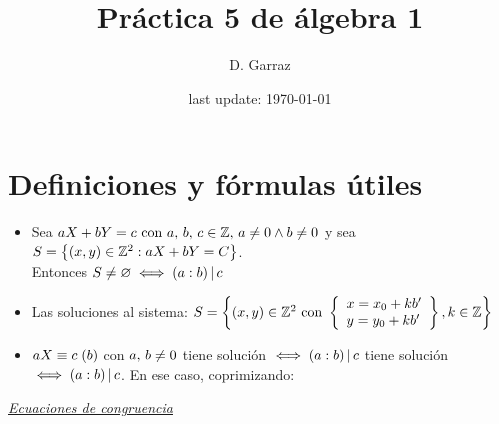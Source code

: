 





\pagestyle{empty} %

\title{Práctica 5 de álgebra 1} %
\author{D. Garraz} %
\date{last update: \today} %

\maketitle  %

\section{Definiciones y fórmulas útiles}

\def\mcd{(a:b)}

\begin{itemize}
	\item Sea $aX + bY = c \text{ con } a,\, b,\, c \en \enteros,\, a \distinto 0 \y b \distinto 0$ y sea
	      $S = \set{ (x,y) \en \enteros^2 : aX + bY = C }$.\\
	      Entonces $S \distinto \vacio \sisolosi (a:b) \divideA c$

	\item Las soluciones al sistema: $S = \set{(x,y) \en \enteros^2 \text{ con }
			      \llaves{l}{
				      x = x_0 + kb'\\
				      y = y_0 + kb'
			      }
			      , k \en \enteros}
	      $

	\item $\congruencia{aX}{c}{b}$ con $ a,\, b \distinto 0$ tiene solución $\sisolosi \mcd \divideA c$ tiene solución $\sisolosi \mcd \divideA c$. En ese caso, coprimizando:
\end{itemize}

\textit\underline{Ecuaciones de congruencia}

